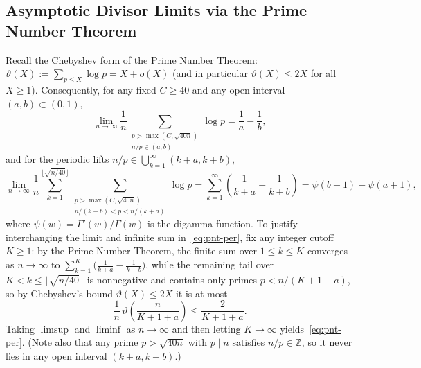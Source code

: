 \documentclass[11pt,reqno]{amsart}
\theoremstyle{definition}
\theoremstyle{remark}
\newcommand{\ZZ}{\mathbb{Z}}
\begin{document}
\subsection{Asymptotic Divisor Limits via the Prime Number Theorem}
Recall the Chebyshev form of the Prime Number Theorem: $\vartheta(X) := \sum_{p \le X} \log p = X + o(X)$ (and in particular $\vartheta(X) \le 2X$ for all $X \ge 1$). Consequently, for any fixed $C \ge 40$ and any open interval $(a, b) \subset (0, 1)$,
\begin{equation}
\label{eq:pnt-u1}
  \lim_{n \to \infty} \frac{1}{n} \sum_{\substack{p > \max(C, \sqrt{40n}) \\ n/p \in (a, b)}} \log p
  = \frac{1}{a} - \frac{1}{b},
\end{equation}
and for the periodic lifts $n/p \in \bigcup_{k=1}^{\infty} (k + a, k + b)$,
\begin{equation}
\label{eq:pnt-per}
  \lim_{n \to \infty} \frac{1}{n} \sum_{k=1}^{\lfloor \sqrt{n/40} \rfloor} \sum_{\substack{p > \max(C, \sqrt{40n}) \\ n/(k+b) < p < n/(k+a)}} \log p
  = \sum_{k=1}^{\infty} \left(\frac{1}{k + a} - \frac{1}{k + b}\right)
  = \psi(b + 1) - \psi(a + 1),
\end{equation}
where $\psi(w) = \Gamma'(w)/\Gamma(w)$ is the digamma function. To justify interchanging the limit and infinite sum in~\eqref{eq:pnt-per}, fix any integer cutoff $K \ge 1$: by the Prime Number Theorem, the finite sum over $1 \le k \le K$ converges as $n \to \infty$ to $\sum_{k=1}^{K}\bigl(\frac{1}{k+a} - \frac{1}{k+b}\bigr)$, while the remaining tail over $K < k \le \lfloor\sqrt{n/40}\rfloor$ is nonnegative and contains only primes $p < n/(K + 1 + a)$, so by Chebyshev's bound $\vartheta(X) \le 2X$ it is at most
\[
  \frac{1}{n}\,\vartheta\!\left(\frac{n}{K + 1 + a}\right) \le \frac{2}{K + 1 + a}.
\]
Taking $\limsup$ and $\liminf$ as $n \to \infty$ and then letting $K \to \infty$ yields~\eqref{eq:pnt-per}. (Note also that any prime $p > \sqrt{40n}$ with $p \mid n$ satisfies $n/p \in \ZZ$, so it never lies in any open interval $(k+a, k+b)$.)
\end{document}

